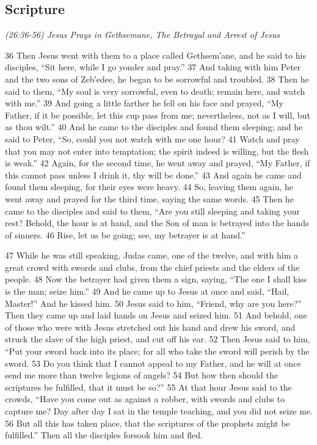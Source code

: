 \documentclass[letterpaper]{report}
\begin{document}
\subsection{Scripture}

{\centering
	\emph{(26:36-56) Jesus Prays in Gethsemane, The Betrayal and Arrest of Jesus}\\
}
\begin{multicols}{2}
36 Then Jesus went with them to a place called Gethsem′ane, and he said to his disciples, “Sit here, while I go yonder and pray.” 37 And taking with him Peter and the two sons of Zeb′edee, he began to be sorrowful and troubled. 38 Then he said to them, “My soul is very sorrowful, even to death; remain here, and watch with me.” 39 And going a little farther he fell on his face and prayed, “My Father, if it be possible, let this cup pass from me; nevertheless, not as I will, but as thou wilt.” 40 And he came to the disciples and found them sleeping; and he said to Peter, “So, could you not watch with me one hour? 41 Watch and pray that you may not enter into temptation; the spirit indeed is willing, but the flesh is weak.” 42 Again, for the second time, he went away and prayed, “My Father, if this cannot pass unless I drink it, thy will be done.” 43 And again he came and found them sleeping, for their eyes were heavy. 44 So, leaving them again, he went away and prayed for the third time, saying the same words. 45 Then he came to the disciples and said to them, “Are you still sleeping and taking your rest? Behold, the hour is at hand, and the Son of man is betrayed into the hands of sinners. 46 Rise, let us be going; see, my betrayer is at hand.”

47 While he was still speaking, Judas came, one of the twelve, and with him a great crowd with swords and clubs, from the chief priests and the elders of the people. 48 Now the betrayer had given them a sign, saying, “The one I shall kiss is the man; seize him.” 49 And he came up to Jesus at once and said, “Hail, Master!” And he kissed him. 50 Jesus said to him, “Friend, why are you here?” Then they came up and laid hands on Jesus and seized him. 51 And behold, one of those who were with Jesus stretched out his hand and drew his sword, and struck the slave of the high priest, and cut off his ear. 52 Then Jesus said to him, “Put your sword back into its place; for all who take the sword will perish by the sword. 53 Do you think that I cannot appeal to my Father, and he will at once send me more than twelve legions of angels? 54 But how then should the scriptures be fulfilled, that it must be so?” 55 At that hour Jesus said to the crowds, “Have you come out as against a robber, with swords and clubs to capture me? Day after day I sat in the temple teaching, and you did not seize me. 56 But all this has taken place, that the scriptures of the prophets might be fulfilled.” Then all the disciples forsook him and fled.
\end{multicols}
\end{document}
